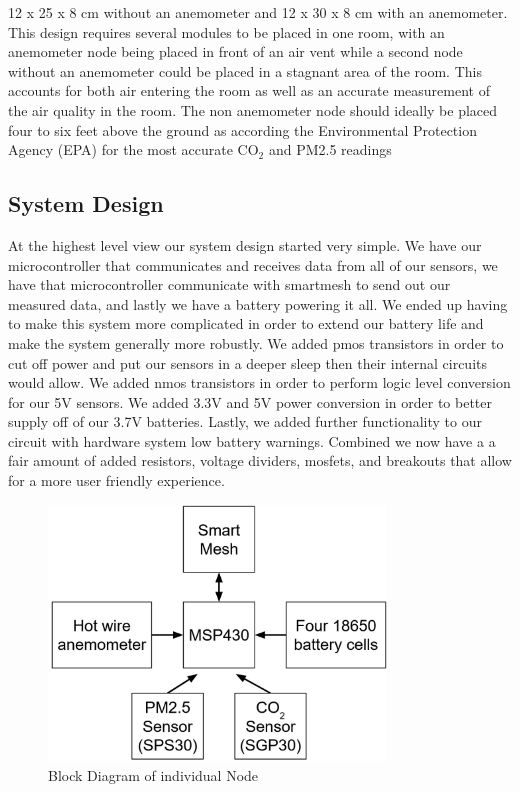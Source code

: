 12 x 25 x 8 cm without an anemometer and
12 x 30 x 8 cm with an anemometer. This design requires several modules to be placed in one room, with an anemometer node being placed in front of an air vent while a second node without an anemometer could be placed in a stagnant area of the room. This accounts for both air entering the room as well as an accurate measurement of the air quality in the room. The non anemometer node should ideally be placed four to six feet above the ground as according the Environmental Protection Agency (EPA) for the most accurate CO$_2$ and PM2.5 readings

\subsection{System Design}
At the highest level view our system design started very simple. We have our microcontroller that communicates and receives data from all of our sensors, we have that microcontroller communicate with smartmesh to send out our measured data, and lastly we have a battery powering it all. We ended up having to make this system more complicated in order to extend our battery life and make the system generally more robustly. We added pmos transistors in order to cut off power and put our sensors in a deeper sleep then their internal circuits would allow. We added nmos transistors in order to perform logic level conversion for our 5V sensors. We added 3.3V and 5V power conversion in order to better supply off of our 3.7V batteries. Lastly, we added further functionality to our circuit with hardware system low battery warnings. Combined we now have a a fair amount of added resistors, voltage dividers, mosfets, and breakouts that allow for a more user friendly experience.
\begin{figure}[H]
    \centering
    \includegraphics[width=0.8\textwidth]{Pictures/image (5).png}
    \caption[Block Diagram of individual Node]{Block Diagram of individual Node} 
    \label{fig:part1commrin}
\end{figure}

